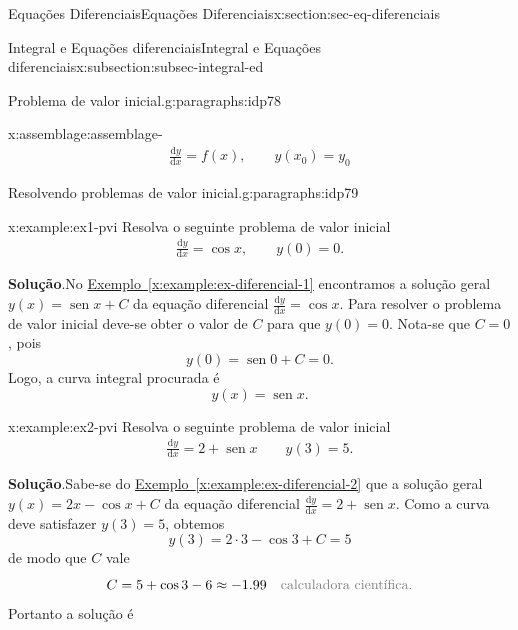 \documentclass[oneside,10pt,]{article}
\newcommand{\blocktitlefont}{\relax}
\newcommand{\xreffont}{\relax}
\numberwithin{equation}{section}
\newcommand{\dd}{\mathrm{d}}
\DeclareMathOperator{\sin}{sen}
\begin{document}
\begin{sectionptx}{Equações Diferenciais}{}{Equações Diferenciais}{}{}{x:section:sec-eq-diferenciais}
\begin{subsectionptx}{Integral e Equações diferenciais}{}{Integral e Equações diferenciais}{}{}{x:subsection:subsec-integral-ed}
\begin{paragraphs}{Problema de valor inicial.}{g:paragraphs:idp78}
\begin{assemblage}{}{x:assemblage:assemblage-}
%
\begin{gather}
\frac{\dd y}{\dd x}=f(x), \qquad y(x_0)=y_0\label{x:mrow:eq-pvi}
\end{gather}
%
\end{assemblage}
%
\end{paragraphs}%
\begin{paragraphs}{Resolvendo problemas de valor inicial.}{g:paragraphs:idp79}%
\begin{example}{}{x:example:ex1-pvi}%
Resolva o seguinte problema de valor inicial%
\begin{gather*}
\frac{\dd y}{\dd x}=\cos{x}, \qquad y(0)=0 \text{.}
\end{gather*}
%
\par\smallskip%
\noindent\textbf{\blocktitlefont Solução}.\hypertarget{g:solution:idp80}{}\quad{}No \hyperref[x:example:ex-diferencial-1]{Exemplo~{\xreffont\ref{x:example:ex-diferencial-1}}} encontramos a solução geral \(y(x)=\sin{x}+C\) da equação diferencial \(\frac{\dd y}{\dd x}=\cos{x}\). Para resolver o problema de valor inicial deve-se obter o valor de \(C\) para que \(y(0)=0\). Nota-se que \(C=0\), pois%
\begin{equation*}
y(0)=\sin{0} + C=0\text{.}
\end{equation*}
Logo, a curva integral procurada é%
\begin{equation*}
y(x)=\sin{x}\text{.}
\end{equation*}
%
\end{example}
\begin{example}{}{x:example:ex2-pvi}%
Resolva o seguinte problema de valor inicial%
\begin{gather*}
\frac{\dd y}{\dd x}= 2+ \sin{x} \qquad y(3)=5 \text{.}
\end{gather*}
%
\par\smallskip%
\noindent\textbf{\blocktitlefont Solução}.\hypertarget{g:solution:idp81}{}\quad{}Sabe-se do \hyperref[x:example:ex-diferencial-2]{Exemplo~{\xreffont\ref{x:example:ex-diferencial-2}}} que a solução geral \(y(x)=2x - \cos{x} +C\) da equação diferencial \(\frac{\dd y}{\dd x}= 2+ \sin{x}\). Como a curva deve satisfazer \(y(3)=5\), obtemos%
\begin{equation*}
y(3)=2\cdot 3-\cos{3} + C=5
\end{equation*}
de modo que \(C\) vale%
\begin{equation*}
C = 5+\cos{3}-6 \approx -1.99 \quad \color{gray}{\text{calculadora científica}}\text{.}
\end{equation*}
Portanto a solução é%

\end{example}
\end{paragraphs}
\end{subsectionptx}
\end{sectionptx}
\end{document}
